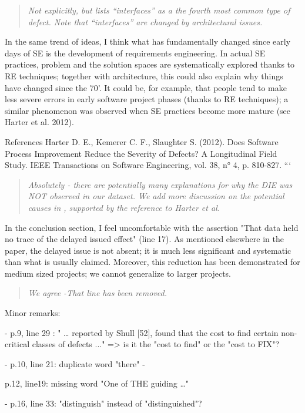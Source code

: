 \begin{quote}{\em
Not explicitly, but  lists ``interfaces'' as a the fourth most
common type of defect. Note that ``interfaces'' are changed by architectural
issues. }\end{quote}
 
In the same trend of ideas, I think what has
fundamentally changed since early days of SE is the
development of requirements engineering. In actual SE
practices, problem and the solution spaces are
systematically explored thanks to RE techniques; together
with architecture, this could also explain why things have
changed since the 70'. It could be, for example, that people
tend to make less severe errors in early software project
phases (thanks to RE techniques); a similar phenomenon was
observed when SE practices become more mature (see Harter et
al. 2012).  

References Harter D. E., Kemerer C. F., Slaughter S. (2012).
Does Software Process Improvement Reduce the Severity of
Defects? A Longitudinal Field Study. IEEE Transactions on
Software Engineering, vol. 38, n° 4, p. 810-827.
```

\begin{quote}{\em
  Absolutely - there are potentially many explanations for why the DIE was NOT observed in our dataset. We add more discussion on the potential causes in , supported by the reference to Harter et al.
 }\end{quote}

 
In the conclusion section, I feel uncomfortable with
the assertion "That data held no trace of the delayed issued
effect" (line 17). As mentioned elsewhere in the paper, the
delayed issue is not absent; it is much less significant and
systematic than what is usually claimed. Moreover, this
reduction has been demonstrated for medium sized projects;
we cannot generalize to larger projects.  
\begin{quote}{\em
  We agree -That line has been removed.
 }\end{quote}


Minor remarks: 

- p.9, line 29 : " … reported by Shull [52], found that the cost to find certain non-critical classes of defects ..." => is it the "cost to find" or the "cost to FIX"?  

- p.10, line 21: duplicate word "there" -

p.12, line19: missing word "One of THE guiding …" 

- p.16, line 33: "distinguish" instead of "distinguished"?  

